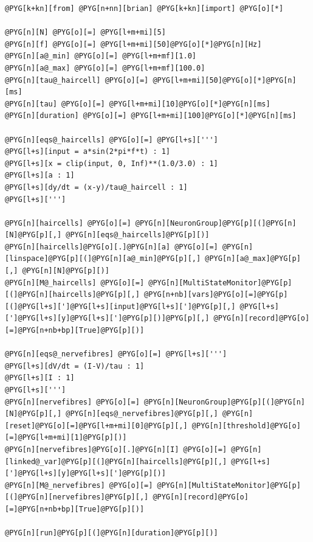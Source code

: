 \documentclass[letterpaper,10pt,english]{manual}
\begin{document}
\begin{Verbatim}[commandchars=@\[\]]
@PYG[k+kn][from] @PYG[n+nn][brian] @PYG[k+kn][import] @PYG[o][*]

@PYG[n][N] @PYG[o][=] @PYG[l+m+mi][5]
@PYG[n][f] @PYG[o][=] @PYG[l+m+mi][50]@PYG[o][*]@PYG[n][Hz]
@PYG[n][a@_min] @PYG[o][=] @PYG[l+m+mf][1.0]
@PYG[n][a@_max] @PYG[o][=] @PYG[l+m+mf][100.0]
@PYG[n][tau@_haircell] @PYG[o][=] @PYG[l+m+mi][50]@PYG[o][*]@PYG[n][ms]
@PYG[n][tau] @PYG[o][=] @PYG[l+m+mi][10]@PYG[o][*]@PYG[n][ms]
@PYG[n][duration] @PYG[o][=] @PYG[l+m+mi][100]@PYG[o][*]@PYG[n][ms]

@PYG[n][eqs@_haircells] @PYG[o][=] @PYG[l+s][''']
@PYG[l+s][input = a*sin(2*pi*f*t) : 1]
@PYG[l+s][x = clip(input, 0, Inf)**(1.0/3.0) : 1]
@PYG[l+s][a : 1]
@PYG[l+s][dy/dt = (x-y)/tau@_haircell : 1]
@PYG[l+s][''']

@PYG[n][haircells] @PYG[o][=] @PYG[n][NeuronGroup]@PYG[p][(]@PYG[n][N]@PYG[p][,] @PYG[n][eqs@_haircells]@PYG[p][)]
@PYG[n][haircells]@PYG[o][.]@PYG[n][a] @PYG[o][=] @PYG[n][linspace]@PYG[p][(]@PYG[n][a@_min]@PYG[p][,] @PYG[n][a@_max]@PYG[p][,] @PYG[n][N]@PYG[p][)]
@PYG[n][M@_haircells] @PYG[o][=] @PYG[n][MultiStateMonitor]@PYG[p][(]@PYG[n][haircells]@PYG[p][,] @PYG[n+nb][vars]@PYG[o][=]@PYG[p][(]@PYG[l+s][']@PYG[l+s][input]@PYG[l+s][']@PYG[p][,] @PYG[l+s][']@PYG[l+s][y]@PYG[l+s][']@PYG[p][)]@PYG[p][,] @PYG[n][record]@PYG[o][=]@PYG[n+nb+bp][True]@PYG[p][)]

@PYG[n][eqs@_nervefibres] @PYG[o][=] @PYG[l+s][''']
@PYG[l+s][dV/dt = (I-V)/tau : 1]
@PYG[l+s][I : 1]
@PYG[l+s][''']
@PYG[n][nervefibres] @PYG[o][=] @PYG[n][NeuronGroup]@PYG[p][(]@PYG[n][N]@PYG[p][,] @PYG[n][eqs@_nervefibres]@PYG[p][,] @PYG[n][reset]@PYG[o][=]@PYG[l+m+mi][0]@PYG[p][,] @PYG[n][threshold]@PYG[o][=]@PYG[l+m+mi][1]@PYG[p][)]
@PYG[n][nervefibres]@PYG[o][.]@PYG[n][I] @PYG[o][=] @PYG[n][linked@_var]@PYG[p][(]@PYG[n][haircells]@PYG[p][,] @PYG[l+s][']@PYG[l+s][y]@PYG[l+s][']@PYG[p][)]
@PYG[n][M@_nervefibres] @PYG[o][=] @PYG[n][MultiStateMonitor]@PYG[p][(]@PYG[n][nervefibres]@PYG[p][,] @PYG[n][record]@PYG[o][=]@PYG[n+nb+bp][True]@PYG[p][)]

@PYG[n][run]@PYG[p][(]@PYG[n][duration]@PYG[p][)]


\end{Verbatim}
\end{document}
